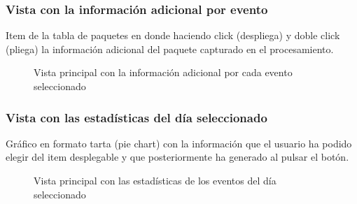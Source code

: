 \subsubsection{Vista con la información adicional por evento}
Item de la tabla de paquetes en donde haciendo click (despliega) y doble click (pliega) la información adicional del paquete capturado en el procesamiento.
\begin{figure}[H]
\caption{Vista principal con la información adicional por cada evento seleccionado}
\end{figure}

\subsubsection{Vista con las estadísticas del día seleccionado}
Gráfico en formato tarta (pie chart) con la información que el usuario ha podido elegir del item desplegable y que posteriormente ha generado al pulsar el botón.
\begin{figure}[H]
\caption{Vista principal con las estadísticas de los eventos del día seleccionado}
\end{figure}
